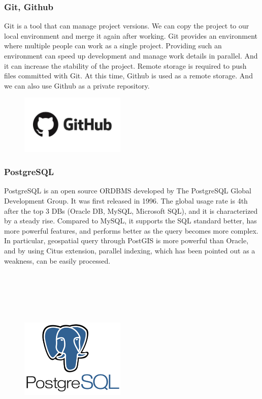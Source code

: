 \documentclass[conference]{IEEEtran}
\begin{document}
\subsubsection{Git, Github}
Git is a tool that can manage project versions. We can copy the project to our local environment and merge it again after working. Git provides an environment where multiple people can work as a single project. Providing such an environment can speed up development and manage work details in parallel. And it can increase the stability of the project. Remote storage is required to push files committed with Git. At this time, Github is used as a remote storage. And we can also use Github as a private repository.\\
\begin{figure}[h!]
\centering
\includegraphics[width=5cm]{imagefolder/github.jpg}
\caption{}
\label{fig:map}
\end{figure}

\subsubsection{PostgreSQL}
PostgreSQL is an open source ORDBMS developed by The PostgreSQL Global Development Group. It was first released in 1996. The global usage rate is 4th after the top 3 DBs (Oracle DB, MySQL, Microsoft SQL), and it is characterized by a steady rise.
Compared to MySQL, it supports the SQL standard better, has more powerful features, and performs better as the query becomes more complex. In particular, geospatial query through PostGIS is more powerful than Oracle, and by using Citus extension, parallel indexing, which has been pointed out as a weakness, can be easily processed.\\
\\
\\
\\
\\
\\
\begin{figure}[h!]
\centering
\includegraphics[width=5cm]{imagefolder/postgresql.png}
\caption{}
\label{fig:map}
\end{figure}
\end{document}
